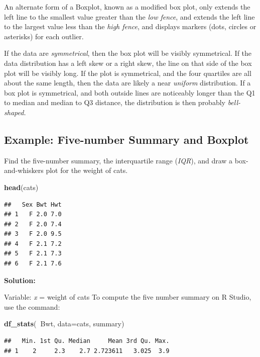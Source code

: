 \documentclass[]{book}
\newenvironment{Shaded}{\begin{snugshade}}{\end{snugshade}}
\newcommand{\DataTypeTok}[1]{\textcolor[rgb]{0.13,0.29,0.53}{#1}}
\newcommand{\KeywordTok}[1]{\textcolor[rgb]{0.13,0.29,0.53}{\textbf{#1}}}
\newcommand{\NormalTok}[1]{#1}
\newcommand{\OperatorTok}[1]{\textcolor[rgb]{0.81,0.36,0.00}{\textbf{#1}}}
\begin{document}
An alternate form of a Boxplot, known as a modified box plot, only extends the left line to the smallest value greater than the \emph{low fence}, and extends the left line to the largest value less than
the \emph{high fence}, and displays markers (dots, circles or asterisks) for each outlier.

If the data are \emph{symmetrical}, then the box plot will be visibly symmetrical. If the data distribution has a left skew or a right skew, the line on that side of the box plot will be visibly long. If the plot is symmetrical, and the four quartiles are all about the same length, then the data are likely a near \emph{uniform} distribution. If a box plot is symmetrical, and both outside lines are noticeably longer than the Q1 to median and median to Q3 distance, the distribution is then probably
\emph{bell-shaped.}

\hypertarget{example-five-number-summary-and-boxplot}{%
\subsection{Example: Five-number Summary and Boxplot}\label{example-five-number-summary-and-boxplot}}

Find the five-number summary, the interquartile range (\emph{IQR}), and draw a box-and-whiskers plot for the weight of cats.

\begin{Shaded}
\begin{Highlighting}[]
\KeywordTok{head}\NormalTok{(cats)}
\end{Highlighting}
\end{Shaded}

\begin{verbatim}
##   Sex Bwt Hwt
## 1   F 2.0 7.0
## 2   F 2.0 7.4
## 3   F 2.0 9.5
## 4   F 2.1 7.2
## 5   F 2.1 7.3
## 6   F 2.1 7.6
\end{verbatim}

\textbf{Solution:}

Variable: \emph{x} = weight of cats
To compute the five number summary on R Studio, use the command:

\begin{Shaded}
\begin{Highlighting}[]
\KeywordTok{df_stats}\NormalTok{(}\OperatorTok{~}\NormalTok{Bwt, }\DataTypeTok{data=}\NormalTok{cats, summary)}
\end{Highlighting}
\end{Shaded}

\begin{verbatim}
##   Min. 1st Qu. Median     Mean 3rd Qu. Max.
## 1    2     2.3    2.7 2.723611   3.025  3.9
\end{verbatim}
\end{document}

